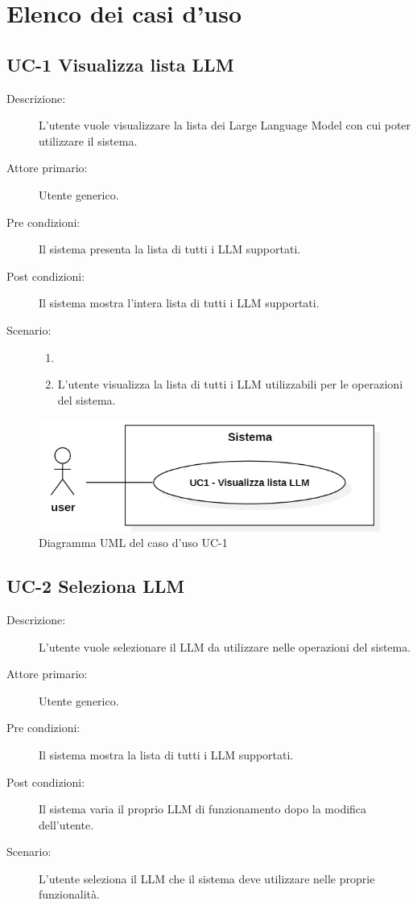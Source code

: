 \newpage

\section{Elenco dei casi d'uso}

\subsection{UC-1 Visualizza lista LLM}
\begin{description}
    \item[Descrizione:] L’utente vuole visualizzare la lista dei Large Language Model con cui poter utilizzare il sistema.
    \item[Attore primario:] Utente generico.
    \item[Pre condizioni:] Il sistema presenta la lista di tutti i LLM supportati.
    \item[Post condizioni:] Il sistema mostra l’intera lista di tutti i LLM supportati.
    \item[Scenario:] 
    \begin{enumerate}
        \item[]
        \item L’utente visualizza la lista di tutti i LLM utilizzabili per le operazioni del sistema.
    \end{enumerate}
\end{description}

\begin{figure}[H]
    \centering
    \includegraphics[width=0.8\linewidth]{UC1.PNG}
    \caption{Diagramma UML del caso d'uso UC-1}
\end{figure}

\subsection{UC-2 Seleziona LLM}
\begin{description}
    \item[Descrizione:] L’utente vuole selezionare il LLM da utilizzare nelle operazioni del sistema.
    \item[Attore primario:] Utente generico.
    \item[Pre condizioni:] Il sistema mostra la lista di tutti i LLM supportati.
    \item[Post condizioni:] Il sistema varia il proprio LLM di funzionamento dopo la modifica dell'utente.
    \item[Scenario:]  L'utente seleziona il LLM che il sistema deve utilizzare nelle proprie funzionalità.
    
\end{description}

